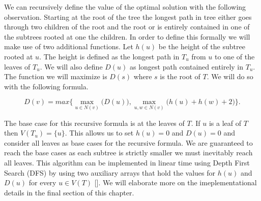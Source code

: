 We can recursively define the value of the optimal solution with the following observation. Starting at the root of the tree the longest path in tree either goes through two children of the root and the root or is entirely contained in one of the subtrees rooted at one the children. In order to define this formally we will make use of two additional functions. Let $h(u)$ be the height of the subtree rooted at $u$. The height is defined as the longest path in $T_u$ from $u$ to one of the leaves of $T_u$. We will also define $D(u)$ as longest path contained entirely in $T_u$. The function we will maximize is $D(s)$ where $s$ is the root of $T$. We will do so with the following formula.

$$ D(v) = max\bigg\{ \max\limits_{u \in N(v)}\bigg(D(u)\bigg), \max\limits_{u, w \in N(v)}\bigg(h(u) + h(w) + 2\bigg) \bigg\}. $$

The base case for this recursive formula is at the leaves of $T$. If $u$ is a leaf of $T$ then $V(T_u) = \{u\}$. This allows us to set $h(u) = 0$ and $D(u) = 0$ and consider all leaves as base cases for the recursive formula. We are guaranteed to reach the base cases as each subtree is strictly smaller we must inevitably reach all leaves. This algorithm can be implemented in linear time using Depth First Search (DFS) by using two auxiliary arrays that hold the values for $h(u)$ and $D(u)$ for every $u \in V(T)$ []. We will elaborate more on the imeplementational details in the final section of this chapter.


